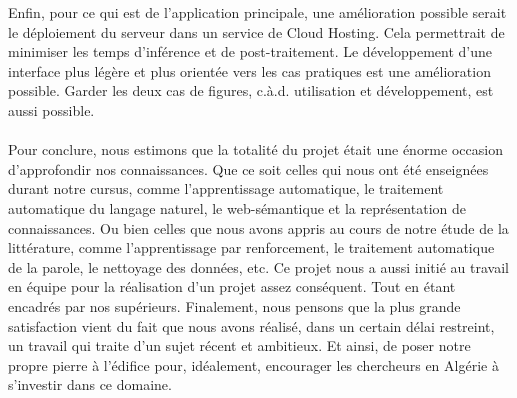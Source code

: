 \par
Enfin, pour ce qui est de l'application principale, une amélioration possible serait le déploiement du serveur dans un service de Cloud Hosting. Cela permettrait de minimiser les temps d'inférence et de post-traitement. Le développement d'une interface plus légère et plus orientée vers les cas pratiques est une amélioration possible. Garder les deux cas de figures, c.à.d. utilisation et développement, est aussi possible.

\paragraph{}
Pour conclure, nous estimons que la totalité du projet était une énorme occasion d'approfondir nos connaissances. Que ce soit celles qui nous ont été enseignées durant notre cursus, comme l'apprentissage automatique, le traitement automatique du langage naturel, le web-sémantique et la représentation de connaissances. Ou bien celles que nous avons appris au cours de notre étude de la littérature, comme l'apprentissage par renforcement, le traitement automatique de la parole, le nettoyage des données, etc. Ce projet nous a aussi initié au travail en équipe pour la réalisation d'un projet assez conséquent. Tout en étant encadrés par nos supérieurs.
Finalement, nous pensons que la plus grande satisfaction vient du fait que nous avons réalisé, dans un certain délai restreint, un travail qui traite d'un sujet récent et ambitieux. Et ainsi, de poser notre propre pierre à l'édifice pour, idéalement, encourager les chercheurs en Algérie à s'investir dans ce domaine. 

